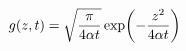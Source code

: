 \[g(z,t)=\sqrt{\frac{\pi}{4\alpha t}}\mathop{\exp\/}\nolimits\!\left(-\frac{z^{2%
}}{4\alpha t}\right)\]